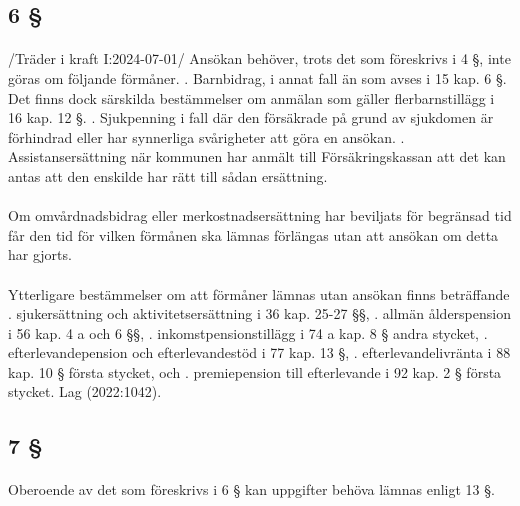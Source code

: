 \documentclass[a4paper,notitlepage,openany,10pt]{book}
\begin{document}
\subsection*{6 §}
\paragraph*{}
/Träder i kraft I:2024-07-01/
Ansökan behöver, trots det som föreskrivs i 4 §, inte göras om följande förmåner.
. Barnbidrag, i annat fall än som avses i 15 kap. 6 §. Det finns dock särskilda bestämmelser om anmälan som gäller flerbarnstillägg i 16 kap. 12 §.
. Sjukpenning i fall där den försäkrade på grund av sjukdomen är förhindrad eller har synnerliga svårigheter att göra en ansökan.
. Assistansersättning när kommunen har anmält till Försäkringskassan att det kan antas att den enskilde har rätt till sådan ersättning.
\paragraph*{}
Om omvårdnadsbidrag eller merkostnadsersättning har beviljats för begränsad tid får den tid för vilken förmånen ska lämnas förlängas utan att ansökan om detta har gjorts.
\paragraph*{}
Ytterligare bestämmelser om att förmåner lämnas utan ansökan finns beträffande
. sjukersättning och aktivitetsersättning i 36 kap. 25-27 §§,
. allmän ålderspension i 56 kap. 4 a och 6 §§,
. inkomstpensionstillägg i 74 a kap. 8 § andra stycket,
. efterlevandepension och efterlevandestöd i 77 kap. 13 §,
. efterlevandelivränta i 88 kap. 10 § första stycket, och
. premiepension till efterlevande i 92 kap. 2 § första stycket.
Lag (2022:1042).
\subsection*{7 §}
\paragraph*{}
Oberoende av det som föreskrivs i 6 § kan uppgifter behöva lämnas enligt 13 §.
\end{document}
